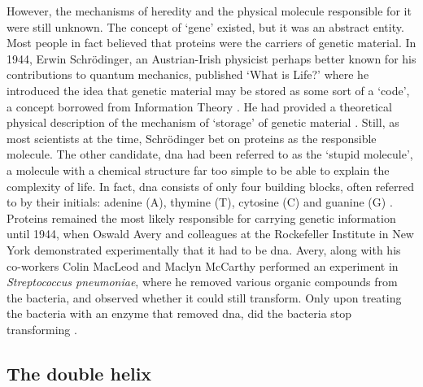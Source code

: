 However, the mechanisms of heredity and the physical molecule responsible for it were still unknown. 
The concept of `gene' existed, but it was an abstract entity. 
Most people in fact believed that proteins were the carriers of genetic material. 
In 1944, Erwin  Schrödinger, an Austrian-Irish physicist perhaps better known for his contributions to quantum mechanics, published `What is Life?' where he introduced the idea that genetic material may be stored as some sort of a `code', a concept borrowed from Information Theory \cite{schrodinger1944what}. 
He had provided a theoretical physical description of the mechanism of `storage' of genetic material \cite{mukherjee2016gene}.
Still, as most scientists at the time, Schrödinger bet on proteins as the responsible molecule. 
The other candidate, \gls{dna} had been referred to as the `stupid molecule', a molecule with a chemical structure far too simple to be able to explain the complexity of life. 
In fact, \gls{dna} consists of only four building blocks, often referred to by their initials: adenine (A), thymine (T), cytosine (C) and guanine (G) \cite{alberts2018molecular}.
Proteins remained the most likely responsible for carrying genetic information until 1944, when Oswald Avery and colleagues at the Rockefeller Institute in New York demonstrated experimentally that it had to be \gls{dna}. 
Avery, along with his co-workers Colin MacLeod and Maclyn McCarthy performed an experiment in \textit{Streptococcus pneumoniae}, where he removed various organic compounds from the bacteria, and observed whether it could still transform. 
Only upon treating the bacteria with an enzyme that removed \gls{dna}, did the bacteria stop transforming \cite{avery1944studies}.


\subsection{The double helix} %
\label{sec:double_helix}

